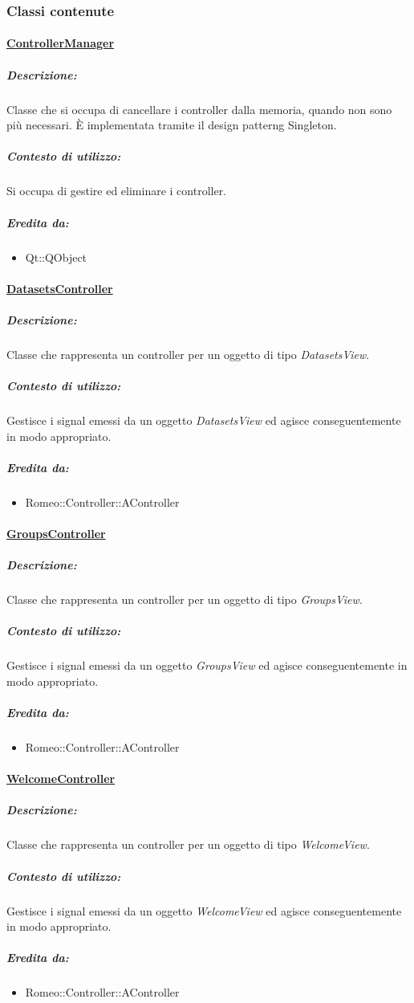 		\subsubsection{Classi contenute}
			\paragraph{\underline{ControllerManager}}
				\subparagraph{Descrizione:}Classe che si occupa di cancellare i controller dalla memoria, quando non sono più necessari. È implementata tramite il design patterng\g{} Singleton.
				\subparagraph{Contesto di utilizzo:}Si occupa di gestire ed eliminare i controller.
				\subparagraph{Eredita da:}
					\begin{itemize}
						\item Qt::QObject
					\end{itemize}
			\paragraph{\underline{DatasetsController}}
				\subparagraph{Descrizione:}Classe che rappresenta un controller per un oggetto di tipo \textsl{DatasetsView}.
				\subparagraph{Contesto di utilizzo:}Gestisce i signal\g{} emessi da un oggetto \textsl{DatasetsView} ed agisce conseguentemente in modo appropriato.
				\subparagraph{Eredita da:}
					\begin{itemize}
						\item Romeo::Controller::AController
					\end{itemize}
			\paragraph{\underline{GroupsController}}
				\subparagraph{Descrizione:}Classe che rappresenta un controller per un oggetto di tipo \textsl{GroupsView}.
				\subparagraph{Contesto di utilizzo:}Gestisce i signal\g{} emessi da un oggetto \textsl{GroupsView} ed agisce conseguentemente in modo appropriato.
				\subparagraph{Eredita da:}
					\begin{itemize}
						\item Romeo::Controller::AController
					\end{itemize}
			\paragraph{\underline{WelcomeController}}
				\subparagraph{Descrizione:}Classe che rappresenta un controller per un oggetto di tipo \textsl{WelcomeView}.
				\subparagraph{Contesto di utilizzo:}Gestisce i signal\g{} emessi da un oggetto \textsl{WelcomeView} ed agisce conseguentemente in modo appropriato.
				\subparagraph{Eredita da:}
					\begin{itemize}
						\item Romeo::Controller::AController
					\end{itemize}
